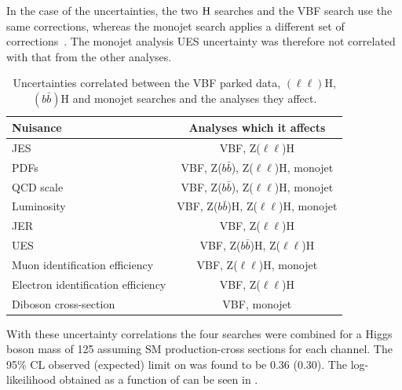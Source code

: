 In the case of the \MET uncertainties, the two \PZ$\rm{H}$ searches and the \ac{VBF} search use the same \MET corrections, whereas the monojet search applies a different set of corrections~\cite{CMS-PAS-EXO-12-055}. The monojet analysis \ac{UES} uncertainty was therefore not correlated with that from the other analyses.

\begin{table}
  \caption{Uncertainties correlated between the \ac{VBF} parked data, \PZ$(\ell\ell)$H, \PZ$(b\bar{b})$H and monojet searches and the analyses they affect.}%
  \label{tab:parkedcorrs}
  \begin{tabular}{|l|c|}
      \hline
      Nuisance & Analyses which it affects \\
      \hline
      \ac{JES} & VBF, Z($\ell\ell$)H \\
      PDFs & VBF, Z($b\bar{b}$), Z($\ell\ell$)H, monojet \\
      QCD scale & VBF, Z($b\bar{b}$), Z($\ell\ell$)H, monojet \\
      Luminosity & VBF, Z($b\bar{b}$)H, Z($\ell\ell$)H, monojet \\
      \ac{JER} & VBF, Z($\ell\ell$)H \\
      \ac{UES} & VBF, Z($b\bar{b}$)H, Z($\ell\ell$)H \\
      Muon identification efficiency & VBF, Z($\ell\ell$)H, monojet \\
      Electron identification efficiency & VBF, Z($\ell\ell$)H \\
      Diboson cross-section & VBF, monojet \\
      \hline
    \end{tabular}
\end{table}

With these uncertainty correlations the four searches were combined for a Higgs boson mass of 125 \GeV assuming \ac{SM} production-cross sections for each channel. The 95\% \ac{CL} observed (expected) limit on \BRinv was found to be 0.36 (0.30). The log-likeilihood obtained as a function of \BRinv can be seen in .

